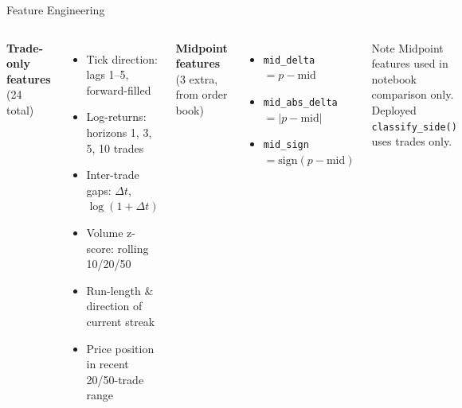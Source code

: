 \documentclass[aspectratio=169,10pt]{beamer}
\newcommand{\code}[1]{\texttt{\small #1}}
\begin{document}
\begin{frame}{Feature Engineering}
  \begin{columns}[T]
    \textbf{Trade-only features} (24 total)
    \begin{itemize}\setlength\itemsep{1pt}
      \item Tick direction: lags 1–5, forward-filled
      \item Log-returns: horizons 1, 3, 5, 10 trades
      \item Inter-trade gaps: $\Delta t$, $\log(1{+}\Delta t)$
      \item Volume z-score: rolling 10/20/50
      \item Run-length \& direction of current streak
      \item Price position in recent 20/50-trade range
    \end{itemize}

    \textbf{Midpoint features} (3 extra, from order book)
    \begin{itemize}
      \item \code{mid\_delta}      $= p - \text{mid}$
      \item \code{mid\_abs\_delta} $= |p - \text{mid}|$
      \item \code{mid\_sign}       $= \mathrm{sign}(p - \text{mid})$
    \end{itemize}

    \medskip
    \begin{alertblock}{Note}
      Midpoint features used in notebook comparison only.\\
      Deployed \code{classify\_side()} uses trades only.
    \end{alertblock}
  \end{columns}
\end{frame}
\end{document}
